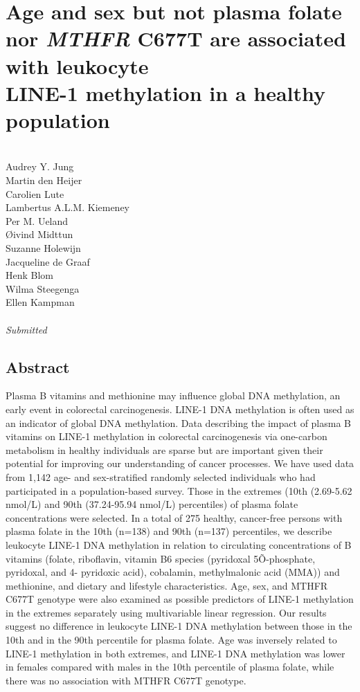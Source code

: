 \chapter{Age and sex but not plasma folate nor \emph{MTHFR} C677T are associated with leukocyte\\ LINE-1 methylation in a healthy population} 
\label{chap3_nbs} 

\quad\\

\noindent
Audrey Y. Jung\\
Martin den Heijer\\
Carolien Lute\\
Lambertus A.L.M. Kiemeney\\
Per M. Ueland\\
{\O}ivind Midttun\\
Suzanne Holewijn\\
Jacqueline de Graaf\\
Henk Blom\\
Wilma Steegenga\\
Ellen Kampman\\

\quad\\


\emph{Submitted}\\


\newpage

\section*{Abstract}

Plasma B vitamins and methionine may influence global DNA methylation, an early event in colorectal carcinogenesis. LINE-1 DNA methylation is often used as an indicator of global DNA methylation. Data describing the impact of plasma B vitamins on LINE-1 methylation in colorectal carcinogenesis via one-carbon metabolism in healthy individuals are sparse but are important given their potential for improving our understanding of cancer processes. We have used data from 1,142 age- and sex-stratified randomly selected individuals who had participated in a population-based survey. Those in the extremes (10th (2.69-5.62 nmol/L) and 90th (37.24-95.94 nmol/L) percentiles) of plasma folate concentrations were selected. In a total of 275 healthy, cancer-free persons with plasma folate in the 10th (n=138) and 90th (n=137) percentiles, we describe leukocyte LINE-1 DNA methylation in relation to circulating concentrations of B vitamins (folate, riboflavin, vitamin B6 species (pyridoxal 5Õ-phosphate, pyridoxal, and 4-
pyridoxic acid), cobalamin, methylmalonic acid (MMA)) and methionine, and dietary and lifestyle characteristics. Age, sex, and MTHFR C677T genotype were also examined as possible predictors of LINE-1 methylation in the extremes separately using multivariable linear regression. Our results suggest no difference in leukocyte LINE-1 DNA methylation between those in the 10th and in the 90th percentile for plasma folate. Age was inversely related to LINE-1 methylation in both extremes, and LINE-1 DNA methylation was lower in females compared with males in the 10th percentile of plasma folate, while there was no association with MTHFR C677T genotype.

